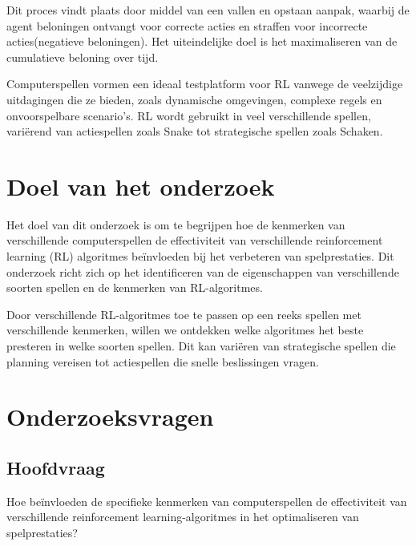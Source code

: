 \documentclass[a4paper,11pt]{report}
\begin{document}
Dit proces vindt plaats door middel van een vallen en opstaan aanpak, waarbij
de agent beloningen ontvangt voor correcte acties en straffen voor incorrecte
acties(negatieve beloningen). Het uiteindelijke doel is het maximaliseren van
de cumulatieve beloning over tijd.

Computerspellen vormen een ideaal testplatform voor RL vanwege de veelzijdige
uitdagingen die ze bieden, zoals dynamische omgevingen, complexe regels en
onvoorspelbare scenario’s. RL wordt gebruikt in veel verschillende spellen,
variërend van actiespellen zoals Snake tot strategische spellen zoals Schaken.

\section{Doel van het onderzoek}
Het doel van dit onderzoek is om te begrijpen hoe de kenmerken van
verschillende computerspellen de effectiviteit van verschillende reinforcement
learning (RL) algoritmes beïnvloeden bij het verbeteren van spelprestaties. Dit
onderzoek richt zich op het identificeren van de eigenschappen van
verschillende soorten spellen en de kenmerken van RL-algoritmes.

Door verschillende RL-algoritmes toe te passen op een reeks spellen met
verschillende kenmerken, willen we ontdekken welke algoritmes het beste
presteren in welke soorten spellen. Dit kan variëren van strategische spellen
die planning vereisen tot actiespellen die snelle beslissingen vragen.
\section{Onderzoeksvragen}
\subsection*{Hoofdvraag}
Hoe beïnvloeden de specifieke kenmerken van computerspellen de effectiviteit
van verschillende reinforcement learning-algoritmes in het optimaliseren van
spelprestaties?
\end{document}
